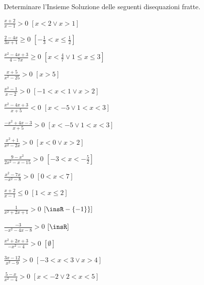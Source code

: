 
\begin{esercizio}[\Ast]
 \label{ese:4.58}
Determinare l'Insieme Soluzione delle seguenti disequazioni fratte.
\begin{multicols}{2}
\begin{enumeratea}
\item \(\frac{x+2}{x-1}>0\) \hfill \(\left[x<2\vee x>1\right]\)
\item \(\frac{2-4x}{3x+1}\ge 0\) \hfill \(\left[-\frac 1 3<x\le \frac 1 2\right]\)
\item \(\frac{x^2-4x+3}{4-7x}\ge 0\) 
 \hfill \(\left[x<\frac 4 7\vee 1\le x\le 3\right]\)
\item \(\frac{x+5}{x^2-25}>0\) \hfill \(\left[x>5\right]\)
\item \(\frac{x^2-1}{x-2}>0\) \hfill \(\left[-1<x<1\vee x>2\right]\)
\item \(\frac{x^2-4x+3}{x+5}<0\) \hfill \(\left[x<-5\vee 1<x<3\right]\)
\item \(\frac{-x^2+4x-3}{x+5}>0\) \hfill \(\left[x<-5\vee 1<x<3\right]\)
\item \(\frac{x^2+1}{x^2-2x}>0\) \hfill \(\left[x<0\vee x>2\right]\)
\item \(\frac{9-x^2}{2x^2-x-15}>0\) \hfill \(\left[-3<x<-\frac 5 2\right]\)
\item \(\frac{x^2-7x}{-x^2-8}>0\) \hfill \(\left[0<x<7\right]\)
\item \(\frac{x+2}{x-1}\le 0\) \hfill \(\left[1< x\le 2\right]\)
\item \(\frac 1{x^2+2x+1}>0\) \hfill \(\left[\insR-\{-1\}\}\right]\)
\item \(\frac{-3}{-x^2-4x-8}>0\) \hfill \(\left[\insR\right]\)
\item \(\frac{x^2+2x+3}{-x^2-4}>0\) \hfill \(\left[\emptyset\right]\)
\item \(\frac{3x-12}{x^2-9}>0\) \hfill \(\left[-3<x<3\vee x>4\right]\)
\item \(\frac{5-x}{x^2-4}>0\) \hfill \(\left[x<-2\vee 2<x<5\right]\)
\end{enumeratea}
\end{multicols}
\end{esercizio}


